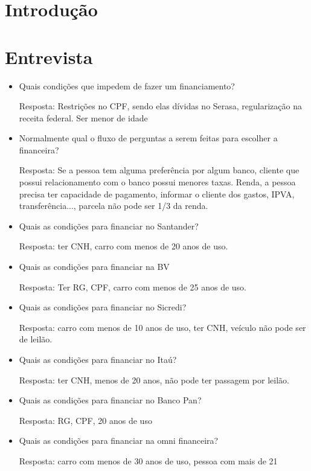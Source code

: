 \documentclass[12pt, a4paper]{article}
\begin{document}
\capa%
\tableofcontents%
\listoffigures\cleardoublepage%

\section{Introdução}\label{sec:intro}

\section{Entrevista}\label{sec:entrevista}
\begin{itemize}
    \item Quais condições que impedem de fazer um financiamento?

    Resposta: Restrições no CPF, sendo elas dívidas no Serasa, regularização na receita federal. Ser menor de idade

    \item Normalmente qual o fluxo de perguntas a serem feitas para escolher a financeira?

    Resposta: Se a pessoa tem alguma preferência por algum banco, cliente que possui relacionamento com o banco possui menores taxas. Renda, a pessoa precisa ter capacidade de pagamento, informar o cliente dos gastos, IPVA, transferência..., parcela não pode ser 1/3 da renda.

    \item Quais as condições para financiar no Santander?

    Resposta: ter CNH, carro com menos de 20 anos de uso.

    \item Quais as condições para financiar na BV

    Resposta: Ter RG, CPF, carro com menos de 25 anos de uso.

    \item Quais as condições para financiar no Sicredi?

    Resposta: carro com menos de 10 anos de uso, ter CNH, veículo não pode ser de leilão.

    \item Quais as condições para financiar no Itaú?

    Resposta: ter CNH, menos de 20 anos, não pode ter passagem por leilão.

    \item Quais as condições para financiar no Banco Pan?

    Resposta: RG, CPF, 20 anos de uso

    \item Quais as condições para financiar na omni financeira?

    Resposta: carro com menos de 30 anos de uso, pessoa com mais de 21
\end{itemize}


\end{document}
